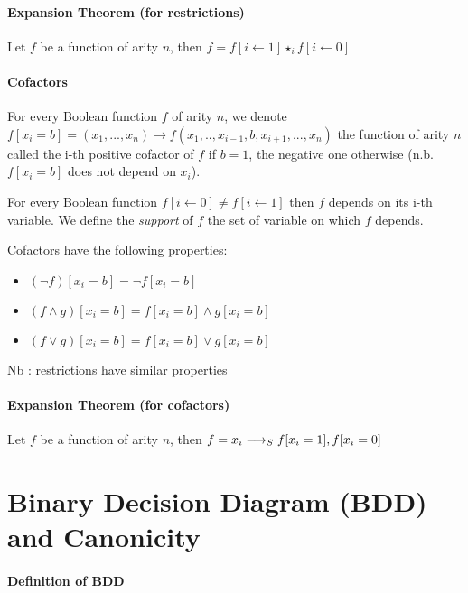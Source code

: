 \documentclass[a4paper,10pt]{article}
\begin{document}
\paragraph{Expansion Theorem (for restrictions)\\}
Let $f$ be a function of arity $n$, then $f = f[i\leftarrow 1]\star_i f[i\leftarrow 0]$

\paragraph{Cofactors\\}

For every Boolean function $f$ of arity $n$, we denote $f[x_i = b] = (x_1, ..., x_n) \rightarrow f(x_1, .., x_{i-1}, b, x_{i+1}, ..., x_n)$ the function of arity $n$ called the i-th positive cofactor of $f$ if $b=1$, the negative one otherwise (n.b. $f[x_i = b]$ does not depend on $x_i$).


For every Boolean function $f[i\leftarrow 0] \neq f[i \leftarrow 1]$ then $f$ depends on its i-th variable. We define the \textit{support} of $f$ the set of variable on which $f$ depends.

Cofactors have the following properties:\begin{itemize}
\item $(\lnot f)[x_i = b] = \lnot f[x_i = b]$
\item $(f\land g)[x_i = b] = f[x_i = b] \land g[x_i = b]$
\item $(f\lor g)[x_i = b] = f[x_i = b] \lor g[x_i = b]$
\end{itemize}
Nb : restrictions have similar properties

\paragraph{Expansion Theorem (for cofactors)\\}
Let $f$ be a function of arity $n$, then $f = x_i \longrightarrow_S f[x_i=1], f[x_i=0]$

\section{Binary Decision Diagram (BDD) and Canonicity}

\paragraph{Definition of BDD\\}
\end{document}
